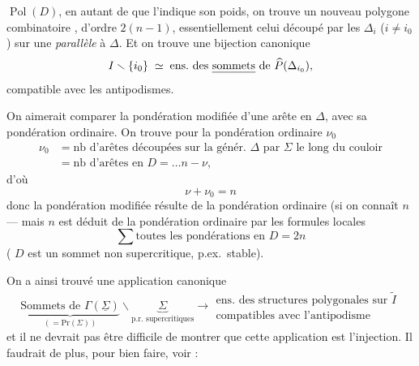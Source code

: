 \documentclass[11pt,a4paper]{article}
\begin{document}
$\operatorname{Pol}(D)$, en autant de  que l'indique son poids, on trouve un nouveau polygone combinatoire , d'ordre $2(n-1)$, essentiellement celui découpé par les $\Delta_i$ ($i \neq i_0$) sur une \emph{parallèle} à $\Delta$. Et on trouve une bijection canonique
\[
I \smallsetminus \lbrace i_0 \rbrace \;\simeq\; \text{ens.\ des \emph{sommets} de } \widehat{P}(\Delta_{i_0}),
\]
compatible avec les antipodismes.

On aimerait comparer la pondération modifiée d'une arête en $\Delta$, avec sa pondération ordinaire. On trouve pour la pondération ordinaire $\nu_0$
\begin{align*}
\nu_0 &= \text{nb d'arêtes découpées sur la génér.\ } \Delta \text{ par } \Sigma \text{ le long du couloir} \\
&= \text{nb d'arêtes en } D = \ldots n - \nu,
\end{align*}
d'où
\[
\nu + \nu_0 = n
\]
donc la pondération modifiée résulte de la pondération ordinaire (si on connaît $n$ --- mais $n$ est déduit de la pondération ordinaire par les formules locales
\[
\textstyle\sum \text{toutes les pondérations en } D = 2n
\]
( $D$ est un sommet non supercritique, p.ex.\ stable).

\struck{\ill{}} On a ainsi trouvé une application canonique
\[
\underbrace{\text{Sommets de } \Gamma(\underline{\Sigma})}_{(= \mathrm{Pr}(\Sigma))} \smallsetminus \underbrace{\Sigma}_{\text{p.r.\ supercritiques}} \longrightarrow \begin{array}{c} \text{ens.\ des structures polygonales sur } \widetilde{I} \\ \text{compatibles avec l'antipodisme} \end{array}
\]
et il ne devrait pas être difficile de montrer que cette application est l'injection. Il faudrait de plus, pour bien faire, voir :
\end{document}
